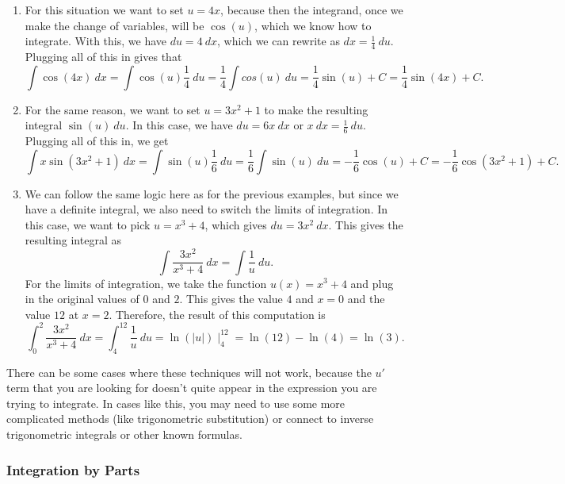 \documentclass{ximera}
\begin{document}
\begin{exampleSol}
    \begin{enumerate}
        \item For this situation we want to set $u = 4x$, because then the integrand, once we make the change of variables, will be $\cos(u)$, which we know how to integrate. With this, we have $du = 4\ dx$, which we can rewrite as $dx = \frac{1}{4}\ du$. Plugging all of this in gives that
            \[ 
                \int \cos(4x)\ dx = \int \cos(u) \frac{1}{4}\ du = \frac{1}{4} \int cos(u)\ du = \frac{1}{4}\sin(u) + C = \frac{1}{4}\sin(4x) + C. 
            \]
        \item For the same reason, we want to set $u = 3x^2 + 1$ to make the resulting integral $\sin(u)\ du$. In this case, we have $du = 6x\  dx$ or $ x\ dx = \frac{1}{6}\ du$. Plugging all of this in, we get
            \[ 
                \int x\sin(3x^2 + 1)\ dx = \int \sin(u) \frac{1}{6}\ du = \frac{1}{6}\int \sin(u)\ du = -\frac{1}{6}\cos(u) + C = -\frac{1}{6}\cos(3x^2 + 1) + C. 
            \]
        \item We can follow the same logic here as for the previous examples, but since we have a definite integral, we also need to switch the limits of integration. In this case, we want to pick $u = x^3 + 4$, which gives $du = 3x^2\ dx$. This gives the resulting integral as 
            \[ 
                \int \frac{3x^2}{x^3 + 4}\ dx = \int \frac{1}{u}\ du. 
            \] 
            For the limits of integration, we take the function $u(x) = x^3 + 4$ and plug in the original values of $0$ and $2$. This gives the value $4$ and $x=0$ and the value $12$ at $x=2$. Therefore, the result of this computation is
            \[  
                \int_0^2 \frac{3x^2}{x^3 + 4}\ dx = \int_4^{12} \frac{1}{u}\ du = \ln(|u|)\mid_4^{12} = \ln(12) - \ln(4) = \ln(3).
            \]
    \end{enumerate}
\end{exampleSol} 

There can be some cases where these techniques will not work, because the $u'$ term that you are looking for doesn't quite appear in the expression you are trying to integrate. In cases like this, you may need to use some more complicated methods (like trigonometric substitution) or connect to inverse trigonometric integrals or other known formulas.


\subsubsection{Integration by Parts}
\end{document}
